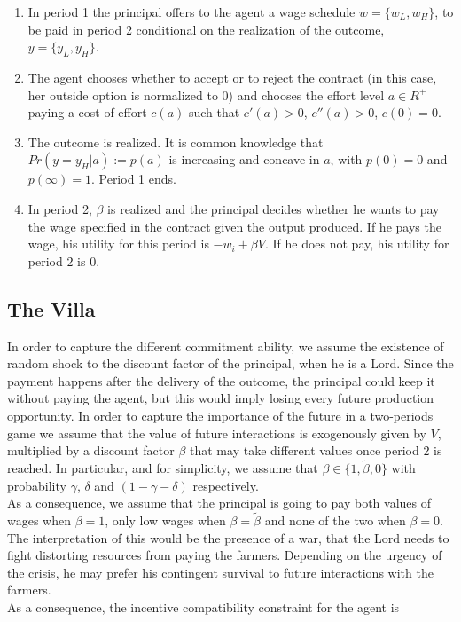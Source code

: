 \documentclass[12pt,a4paper]{article}
\begin{document}
\begin{enumerate}
	\item In period 1 the principal offers to the agent a wage schedule $w = \lbrace w_{L},w_{H} \rbrace$, to be paid in period 2 conditional on the realization of the outcome, $y=\lbrace y_{L},y_{H} \rbrace$.
	\item The agent chooses whether to accept or to reject the contract (in this case, her outside option is normalized to 0) and chooses the effort level $a \in R^{+}$ paying a cost of effort $c(a)$ such that $c'(a)>0$, $c''(a)>0$, $c(0)=0$.
	\item The outcome is realized. It is common knowledge that $Pr\left(y=y_{H} | a\right):=p\left(a\right)$ is increasing and concave in $a$, with $p\left(0\right)=0$ and $p\left(\infty\right)=1$. Period 1 ends.
	\item In period 2, $\beta$ is realized and the principal decides whether he wants to pay the wage specified in the contract given the output produced. If he pays the wage, his utility for this period is $-w_{i}+\beta V$. If he does not pay, his utility for period 2 is 0.
\end{enumerate}

\subsection{The Villa}
In order to capture the different commitment ability, we assume the existence of random shock to the discount factor of the principal, when he is a Lord. Since the payment happens after the delivery of the outcome, the principal could keep it without paying the agent, but this would imply losing every future production opportunity. In order to capture the importance of the future in a two-periods game we assume that the value of future interactions is exogenously given by $V$, multiplied by a discount factor $\beta$ that may take different values once period 2 is reached. In particular, and for simplicity, we assume that $\beta \in \lbrace 1, \tilde{\beta}, 0 \rbrace$ with probability $\gamma$, $\delta$ and $(1-\gamma-\delta)$ respectively.\\
As a consequence, we assume that the principal is going to pay both values of wages when $\beta=1$, only low wages when $\beta=\tilde{\beta}$ and none of the two when $\beta=0$. The interpretation of this would be the presence of a war, that the Lord needs to fight distorting resources from paying the farmers. Depending on the urgency of the crisis, he may prefer his contingent survival to future interactions with the farmers.\\
As a consequence, the incentive compatibility constraint for the agent is
\end{document}
